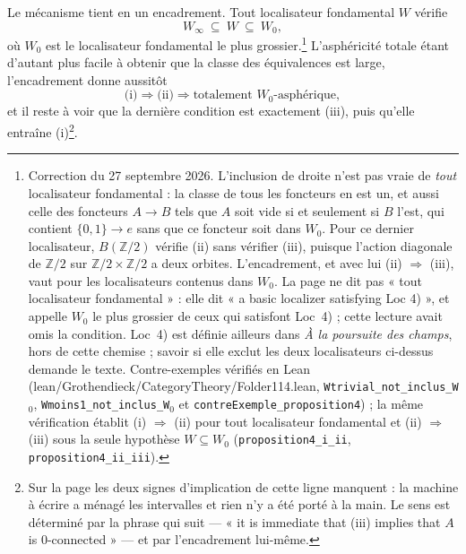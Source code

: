 \documentclass[11pt,a4paper]{article}
\begin{document}
Le mécanisme tient en un encadrement. Tout localisateur fondamental $W$ vérifie
\[
W_{\infty} \ \subseteq\ W \ \subseteq\ W_{0},
\]
où $W_{0}$ est le localisateur fondamental le plus grossier.\footnote{Correction
du 27 septembre 2026. L'inclusion de droite n'est pas vraie de \emph{tout}
localisateur fondamental : la classe de tous les foncteurs en est un, et aussi
celle des foncteurs $A \to B$ tels que $A$ soit vide si et seulement si $B$
l'est, qui contient $\{0, 1\} \to e$ sans que ce foncteur soit dans $W_{0}$.
Pour ce dernier localisateur, $B(\mathbb Z/2)$ vérifie (ii) sans vérifier (iii),
puisque l'action diagonale de $\mathbb Z/2$ sur $\mathbb Z/2 \times \mathbb Z/2$
a deux orbites. L'encadrement, et avec lui (ii) $\Rightarrow$ (iii), vaut pour
les localisateurs contenus dans $W_{0}$. La page ne dit pas « tout localisateur
fondamental » : elle dit « a basic localizer satisfying Loc 4) », et appelle
$W_{0}$ le plus grossier de ceux qui satisfont Loc~4) ; cette lecture avait omis
la condition. Loc~4) est définie ailleurs dans \emph{À la poursuite des
champs}, hors de cette chemise ; savoir si elle exclut les deux localisateurs
ci-dessus demande le texte. Contre-exemples vérifiés en Lean
(lean/Grothendieck/CategoryTheory/Folder114.lean, \texttt{Wtrivial\_not\_inclus\_W}$_{0}$,
\texttt{Wmoins1\_not\_inclus\_W}$_{0}$ et \texttt{contreExemple\_proposition4}) ;
la même vérification établit (i) $\Rightarrow$ (ii) pour tout localisateur
fondamental et (ii) $\Rightarrow$ (iii) sous la seule hypothèse
$W \subseteq W_{0}$ (\texttt{proposition4\_i\_ii},
\texttt{proposition4\_ii\_iii}).} L'asphéricité
totale étant d'autant plus facile à obtenir que la classe des équivalences est
large, l'encadrement donne aussitôt
\[
\text{(i)} \Longrightarrow \text{(ii)} \Longrightarrow
\text{totalement } W_{0}\text{-asphérique},
\]
et il reste à voir que la dernière condition est exactement (iii), puis qu'elle
entraîne (i)\footnote{Sur la page les deux signes d'implication de cette ligne
manquent : la machine à écrire a ménagé les intervalles et rien n'y a été porté
à la main. Le sens est déterminé par la phrase qui suit — « it is immediate that
(iii) implies that $A$ is $0$-connected » — et par l'encadrement lui-même.}.
\end{document}
